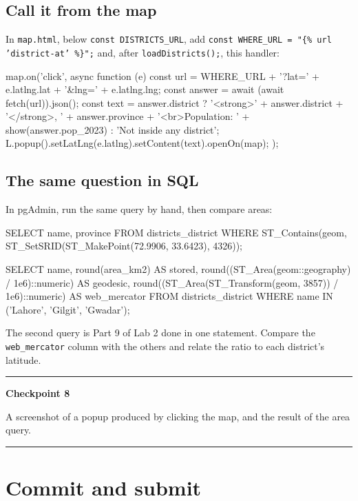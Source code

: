 \documentclass{article}
\newcommand{\cd}[1]{\texttt{#1}}
\newenvironment{keypoint}[1]
  {\par\vspace{.7em}\noindent\rule{\linewidth}{.6pt}\par\vspace{.15em}
   \noindent\textbf{#1}\par\nobreak\vspace{-.3em}}
  {\par\vspace{.15em}\noindent\rule{\linewidth}{.6pt}\par\vspace{.7em}}
\begin{document}
\subsection{Call it from the map}

In \cd{map.html}, below \cd{const DISTRICTS\_URL}, add
\cd{const WHERE\_URL = "\{\% url 'district-at' \%\}";} and, after
\cd{loadDistricts();}, this handler:

\begin{code}
    map.on('click', async function (e) {
      const url = WHERE_URL + '?lat=' + e.latlng.lat + '&lng=' + e.latlng.lng;
      const answer = await (await fetch(url)).json();
      const text = answer.district
        ? '<strong>' + answer.district + '</strong>, ' + answer.province +
          '<br>Population: ' + show(answer.pop_2023)
        : 'Not inside any district';
      L.popup().setLatLng(e.latlng).setContent(text).openOn(map);
    });
\end{code}

\subsection{The same question in SQL}

In pgAdmin, run the same query by hand, then compare areas:

\begin{code}
SELECT name, province FROM districts_district
WHERE ST_Contains(geom, ST_SetSRID(ST_MakePoint(72.9906, 33.6423), 4326));

SELECT name,
       round(area_km2) AS stored,
       round((ST_Area(geom::geography) / 1e6)::numeric) AS geodesic,
       round((ST_Area(ST_Transform(geom, 3857)) / 1e6)::numeric) AS web_mercator
FROM districts_district
WHERE name IN ('Lahore', 'Gilgit', 'Gwadar');
\end{code}

The second query is Part 9 of Lab 2 done in one statement. Compare the
\cd{web\_mercator} column with the others and relate the ratio to each
district's latitude.

\begin{keypoint}{Checkpoint 8}
A screenshot of a popup produced by clicking the map, and the result of
the area query.
\end{keypoint}


\section{Commit and submit}
\end{document}
